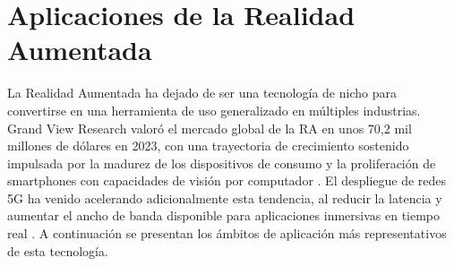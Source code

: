 \section{Aplicaciones de la Realidad Aumentada}
\label{sec:aplicaciones_ra}

La Realidad Aumentada ha dejado de ser una tecnología de nicho para convertirse en una herramienta de uso generalizado en múltiples industrias. Grand View Research valoró el mercado global de la RA en unos 70,2 mil millones de dólares en 2023, con una trayectoria de crecimiento sostenido impulsada por la madurez de los dispositivos de consumo y la proliferación de smartphones con capacidades de visión por computador \citep{GrandViewAR}. El despliegue de redes 5G ha venido acelerando adicionalmente esta tendencia, al reducir la latencia y aumentar el ancho de banda disponible para aplicaciones inmersivas en tiempo real \citep{Ericsson_2020}. A continuación se presentan los ámbitos de aplicación más representativos de esta tecnología.

